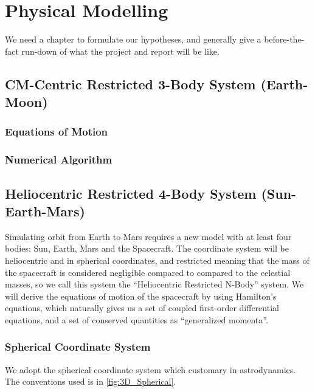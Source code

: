 
\chapter{Physical Modelling}
We need a chapter to formulate our hypotheses, and generally give a before-the-fact run-down of what the project and report will be like.

\section{CM-Centric Restricted 3-Body System (Earth-Moon)}

\subsection{Equations of Motion}

\subsection{Numerical Algorithm}


\section{Heliocentric Restricted 4-Body System (Sun-Earth-Mars)}
Simulating orbit from Earth to Mars requires a new model with at least four bodies: Sun, Earth, Mars and the Spacecraft. The coordinate system will be heliocentric and in spherical coordinates, and restricted meaning that the mass of the spacecraft is considered negligible compared to compared to the celestial masses, so we call this system the ``Heliocentric Restricted N-Body'' system. We will derive the equations of motion of the spacecraft by using Hamilton's equations, which naturally gives us a set of coupled first-order differential equations, and a set of conserved quantities as ``generalized momenta''.

\subsection{Spherical Coordinate System}
We adopt the spherical coordinate system which customary in astrodynamics. The conventions used is in \cref{fig:3D_Spherical}.

